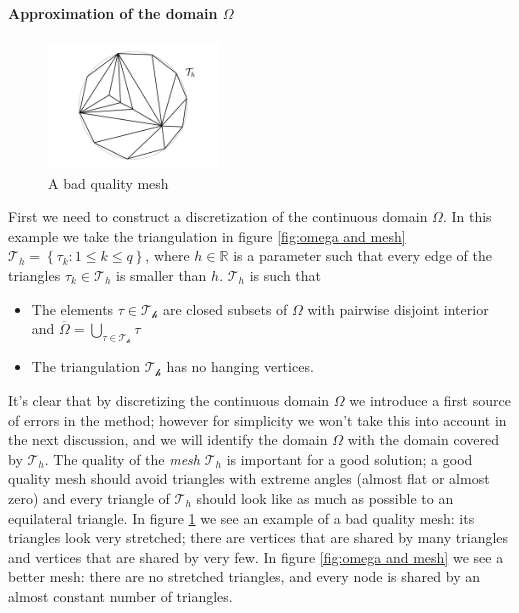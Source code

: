  \paragraph{Approximation of the domain $\Omega$}
 \begin{figure}
 	\begin{center}
 		\includegraphics[width=0.4\textwidth]{figs/Chapter3/badmesh.png}
 	\end{center}
 	\caption{\label{fig:bad mesh}A bad quality mesh}
 \end{figure}
First we need to construct a discretization of the continuous domain $\Omega$. In this example we take the triangulation in figure \ref{fig:omega and mesh} $\mathcal T_h = \left\{\tau_{k} : 1 \leq k \leq q\right\}$, where $h\in\mathbb R$ is a parameter such that every edge of the triangles $\tau_k\in\mathcal T_h$ is smaller than $h$. $\mathcal T_h$ is such that 
\begin{itemize}
	\item The elements \(\tau \in \mathcal{T_h}\) are closed subsets of \(\Omega\) with pairwise disjoint interior and \(\overline{\Omega}=\bigcup_{\tau \in \mathcal{T_h}} \tau\)
	\item The triangulation \(\mathcal{T_h}\) has no hanging vertices.
\end{itemize}

It's clear that by discretizing the continuous domain $\Omega$ we introduce a first source of errors in the method; however for simplicity we won't take this into account in the next discussion, and we will identify the domain $\Omega$ with the domain covered by $\mathcal T_h$. The quality of the \textit{mesh} $\mathcal T_h$ is important for a good solution; a good quality mesh should avoid triangles with extreme angles (almost flat or almost zero) and every triangle of $\mathcal T_h$ should look like as much as possible to an equilateral triangle. In figure \ref{fig:bad mesh} we see an example of a bad quality mesh: its triangles look very stretched; there are vertices that are shared by many triangles and vertices that are shared by very few. In figure \ref{fig:omega and mesh} we see a better mesh: there are no stretched triangles, and every node is shared by an almost constant number of triangles.

